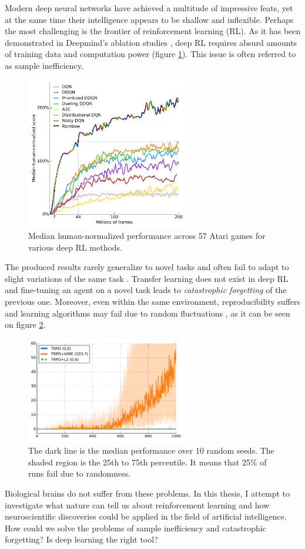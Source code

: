 \documentclass[12pt]{article}
\begin{document}
Modern deep neural networks have achieved a multitude of impressive feats, yet at the same time their intelligence appears to be shallow and inflexible. Perhaps the most challenging is the frontier of reinforcement learning (RL).  As it has been demonstrated in Deepmind's ablation studies \cite{rainbow_dqn}, deep RL requires absurd amounts of training data and computation power (figure \ref{fig:dqn}). This issue is often referred to as sample inefficiency.
\begin{figure}[!htbp]
	\centering
	\includegraphics[width=7cm]{dqn}
	\caption{Median human-normalized performance across
		57 Atari games for various deep RL methods.}
	\label{fig:dqn}
\end{figure} 
The produced results rarely generalize to novel tasks and often fail to adapt to slight variations of the same task \cite{generalisation_in_rl}. Transfer learning does not exist in deep RL and fine-tuning an agent on a novel task leads to \textit{catastrophic forgetting} of the previous one. Moreover, even within the same environment, reproducibility suffers and learning algorithms may fail due to random fluctuations \cite{vime}, as it can be seen on figure \ref{fig:vime}. 
\begin{figure}[!htbp]
	\centering
	\includegraphics[width=7cm]{vime}
	\caption{The dark line is the median performance over 10 random seeds. The shaded region is the 25th to 75th percentile. It means that 25\% of runs fail due to randomness.}
	\label{fig:vime}
\end{figure} 
Biological brains do not suffer from these problems. In this thesis, I attempt to investigate what nature can tell us about reinforcement learning and how neuroscientific discoveries could be applied in the field of artificial intelligence. How could we solve the problems of sample inefficiency and catastrophic forgetting? Is deep learning the right tool?
\end{document}
